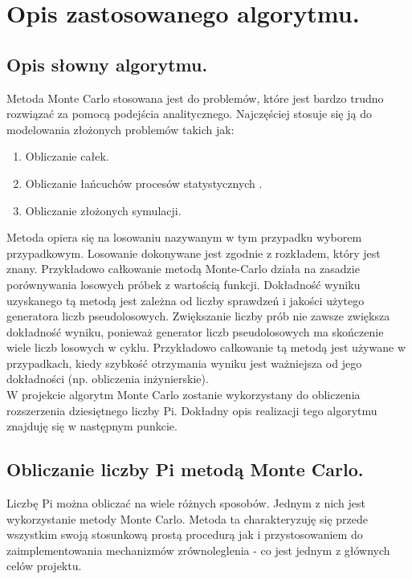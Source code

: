 \documentclass[a4paper,12pt]{article}		%
\begin{document}
\section{Opis zastosowanego algorytmu.}

\subsection{Opis słowny algorytmu.}
Metoda Monte Carlo stosowana jest do problemów, które jest bardzo trudno rozwiązać za pomocą podejścia analitycznego. Najczęściej stosuje się ją do modelowania złożonych problemów takich jak:
 
\begin{enumerate}
\item Obliczanie całek.
\item Obliczanie łańcuchów procesów statystycznych .
\item Obliczanie złożonych symulacji.
\end{enumerate}

Metoda opiera się na losowaniu nazywanym w tym przypadku wyborem przypadkowym. Losowanie dokonywane jest zgodnie z rozkładem, który jest znany. Przykładowo całkowanie metodą Monte-Carlo działa na zasadzie porównywania losowych próbek z wartością funkcji. Dokładność wyniku uzyskanego tą metodą jest zależna od liczby sprawdzeń i jakości użytego generatora liczb pseudolosowych. Zwiększanie liczby prób nie zawsze zwiększa dokładność wyniku, ponieważ generator liczb pseudolosowych ma skończenie wiele liczb losowych w cyklu. Przykładowo całkowanie tą metodą jest używane w przypadkach, kiedy szybkość otrzymania wyniku jest ważniejsza od jego dokładności (np. obliczenia inżynierskie).\\

W projekcie algorytm Monte Carlo zostanie wykorzystany do obliczenia rozszerzenia dziesiętnego liczby Pi. Dokładny opis realizacji tego algorytmu znajduję się w następnym punkcie.

\subsection{Obliczanie liczby Pi metodą Monte Carlo.} 
Liczbę Pi można obliczać na wiele różnych sposobów. Jednym z nich jest wykorzystanie metody Monte Carlo. Metoda ta charakteryzuję się przede wszystkim swoją stosunkową prostą procedurą jak i przystosowaniem do zaimplementowania mechanizmów zrównoleglenia - co jest jednym z głównych celów projektu.
\end{document}
